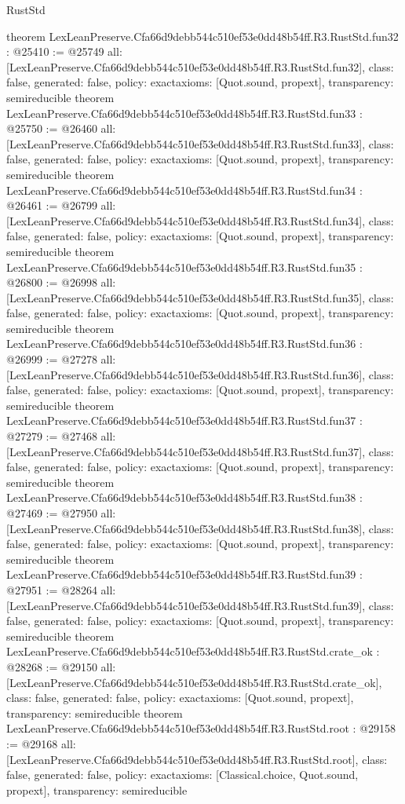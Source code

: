\begin{lexlean}{RustStd}
\begin{coremodule}
{}
theorem LexLeanPreserve.Cfa66d9debb544c510ef53e0dd48b54ff.R3.RustStd.fun32 : @25410 := @25749 {
  all: [LexLeanPreserve.Cfa66d9debb544c510ef53e0dd48b54ff.R3.RustStd.fun32],
  class: false,
  generated: false,
  policy: exact{axioms: [Quot.sound, propext]},
  transparency: semireducible
}
theorem LexLeanPreserve.Cfa66d9debb544c510ef53e0dd48b54ff.R3.RustStd.fun33 : @25750 := @26460 {
  all: [LexLeanPreserve.Cfa66d9debb544c510ef53e0dd48b54ff.R3.RustStd.fun33],
  class: false,
  generated: false,
  policy: exact{axioms: [Quot.sound, propext]},
  transparency: semireducible
}
theorem LexLeanPreserve.Cfa66d9debb544c510ef53e0dd48b54ff.R3.RustStd.fun34 : @26461 := @26799 {
  all: [LexLeanPreserve.Cfa66d9debb544c510ef53e0dd48b54ff.R3.RustStd.fun34],
  class: false,
  generated: false,
  policy: exact{axioms: [Quot.sound, propext]},
  transparency: semireducible
}
theorem LexLeanPreserve.Cfa66d9debb544c510ef53e0dd48b54ff.R3.RustStd.fun35 : @26800 := @26998 {
  all: [LexLeanPreserve.Cfa66d9debb544c510ef53e0dd48b54ff.R3.RustStd.fun35],
  class: false,
  generated: false,
  policy: exact{axioms: [Quot.sound, propext]},
  transparency: semireducible
}
theorem LexLeanPreserve.Cfa66d9debb544c510ef53e0dd48b54ff.R3.RustStd.fun36 : @26999 := @27278 {
  all: [LexLeanPreserve.Cfa66d9debb544c510ef53e0dd48b54ff.R3.RustStd.fun36],
  class: false,
  generated: false,
  policy: exact{axioms: [Quot.sound, propext]},
  transparency: semireducible
}
theorem LexLeanPreserve.Cfa66d9debb544c510ef53e0dd48b54ff.R3.RustStd.fun37 : @27279 := @27468 {
  all: [LexLeanPreserve.Cfa66d9debb544c510ef53e0dd48b54ff.R3.RustStd.fun37],
  class: false,
  generated: false,
  policy: exact{axioms: [Quot.sound, propext]},
  transparency: semireducible
}
theorem LexLeanPreserve.Cfa66d9debb544c510ef53e0dd48b54ff.R3.RustStd.fun38 : @27469 := @27950 {
  all: [LexLeanPreserve.Cfa66d9debb544c510ef53e0dd48b54ff.R3.RustStd.fun38],
  class: false,
  generated: false,
  policy: exact{axioms: [Quot.sound, propext]},
  transparency: semireducible
}
theorem LexLeanPreserve.Cfa66d9debb544c510ef53e0dd48b54ff.R3.RustStd.fun39 : @27951 := @28264 {
  all: [LexLeanPreserve.Cfa66d9debb544c510ef53e0dd48b54ff.R3.RustStd.fun39],
  class: false,
  generated: false,
  policy: exact{axioms: [Quot.sound, propext]},
  transparency: semireducible
}
theorem LexLeanPreserve.Cfa66d9debb544c510ef53e0dd48b54ff.R3.RustStd.crate_ok : @28268 := @29150 {
  all: [LexLeanPreserve.Cfa66d9debb544c510ef53e0dd48b54ff.R3.RustStd.crate_ok],
  class: false,
  generated: false,
  policy: exact{axioms: [Quot.sound, propext]},
  transparency: semireducible
}
theorem LexLeanPreserve.Cfa66d9debb544c510ef53e0dd48b54ff.R3.RustStd.root : @29158 := @29168 {
  all: [LexLeanPreserve.Cfa66d9debb544c510ef53e0dd48b54ff.R3.RustStd.root],
  class: false,
  generated: false,
  policy: exact{axioms: [Classical.choice, Quot.sound, propext]},
  transparency: semireducible
}


\end{coremodule}
\end{lexlean}
